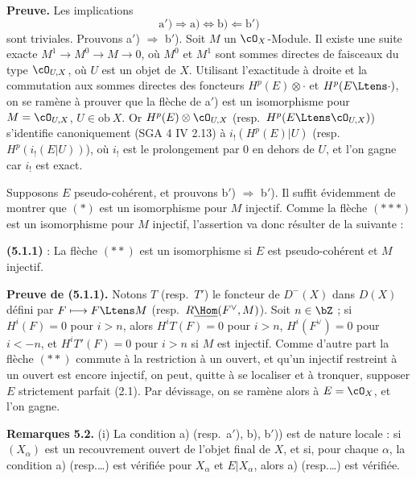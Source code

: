 \medskip

\noindent\textbf{Preuve.} Les implications
\[
\mathrm{a')} \Longrightarrow \mathrm{a)} \Longleftrightarrow \mathrm{b)} \Longleftarrow \mathrm{b')}
\]
sont triviales. Prouvons a$'$) $\Longrightarrow$ b$'$). Soit $M$ un $\cO_X$-Module. Il existe une suite exacte $M^1 \longrightarrow M^0 \longrightarrow M \longrightarrow 0$, o\`{u} $M^0$ et $M^1$ sont sommes directes de faisceaux du type $\cO_{U,X}$, o\`{u} $U$ est un objet de $X$. Utilisant l'exactitude \`{a} droite et la commutation aux sommes directes des foncteurs $H^p(E) \otimes \cdot$ et $H^p(E \Ltens \cdot)$, on se ram\`{e}ne \`{a} prouver que la fl\`{e}che de a$'$) est un isomorphisme pour $M = \cO_{U,X}$, $U \in \mathrm{ob}\ X$. Or $H^p(E) \otimes \cO_{U,X}$ (resp.\ $H^p(E \Ltens \cO_{U,X})$) s'identifie canoniquement (SGA 4 IV 2.13) \`{a} $i_!(H^p(E)|U)$ (resp.\ $H^p(i_!(E|U))$), o\`{u} $i_!$ est le prolongement par 0 en dehors de $U$, et l'on gagne car $i_!$ est exact.

Supposons $E$ pseudo-coh\'{e}rent, et prouvons b$'$) $\Longrightarrow$ b$'$). Il suffit \'{e}videmment de montrer que $(*)$ est un isomorphisme pour $M$ injectif. Comme la fl\`{e}che $(***)$ est un isomorphisme pour $M$ injectif, l'assertion va donc r\'{e}sulter de la suivante :

\smallskip

\noindent\textbf{(5.1.1)} : La fl\`{e}che $(**)$ est un isomorphisme si $E$ est pseudo-coh\'{e}rent et $M$ injectif.

\medskip

\noindent\textbf{Preuve de (5.1.1).} Notons $T$ (resp.\ $T'$) le foncteur de $D^-(X)$ dans $D(X)$ d\'{e}fini par $F \longmapsto F \Ltens M$ (resp.\ $R\underline{\Hom}(F^\vee, M)$). Soit $n \in \bZ$ ; si $H^i(F) = 0$ pour $i > n$, alors $H^iT(F) = 0$ pour $i > n$, $H^i(F^\vee) = 0$ pour $i < -n$, et $H^iT'(F) = 0$ pour $i > n$ si $M$ est injectif. Comme d'autre part la fl\`{e}che $(**)$ commute \`{a} la restriction \`{a} un ouvert, et qu'un injectif restreint \`{a} un ouvert est encore injectif, on peut, quitte \`{a} se localiser et \`{a} tronquer, supposer $E$ strictement parfait (2.1). Par d\'{e}vissage, on se ram\`{e}ne alors \`{a} $E = \cO_X$, et l'on gagne.

\medskip

\noindent\textbf{Remarques 5.2.} (i) La condition a) (resp.\ a$'$), b), b$'$)) est de nature locale : si $(X_\alpha)$ est un recouvrement ouvert de l'objet final de $X$, et si, pour chaque $\alpha$, la condition a) (resp.\ldots) est v\'{e}rifi\'{e}e pour $X_\alpha$ et $E|X_\alpha$, alors a) (resp.\ldots) est v\'{e}rifi\'{e}e.

